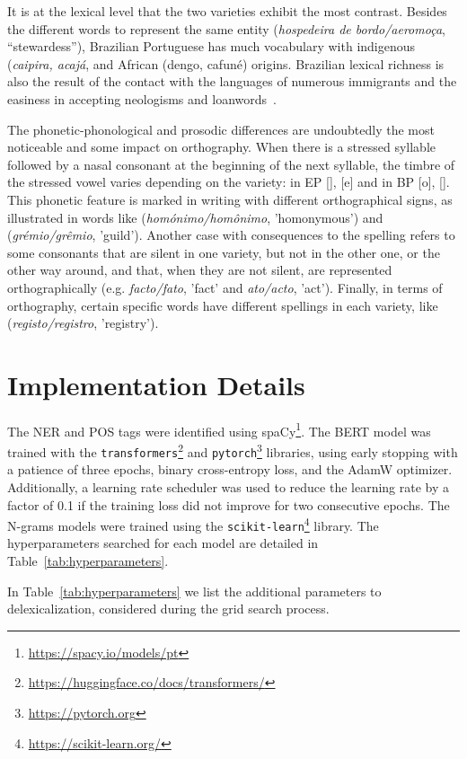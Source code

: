 It is at the lexical level that the two varieties exhibit the most contrast. Besides the different words to represent the same entity (\textit{hospedeira de bordo/aeromoça}, ``stewardess''), Brazilian Portuguese has much vocabulary with indigenous (\textit{caipira, acajá}, and African (dengo, cafuné) origins. Brazilian lexical richness is also the result of the contact with the languages of numerous immigrants and the easiness in accepting neologisms and loanwords~\cite{silva2013portugues}.

The phonetic-phonological and prosodic differences are undoubtedly the most noticeable and some impact on orthography. When there is a stressed syllable followed by a nasal consonant at the beginning of the next syllable, the timbre of the stressed vowel varies depending on the variety: in EP  [\textopeno], [e] and in BP [o], [\textepsilon]. This phonetic feature is marked in writing with different orthographical signs, as illustrated in words like (\textit{homónimo/homônimo}, 'homonymous') and (\textit{grémio/grêmio}, 'guild'). Another case with consequences to the spelling refers to some consonants that are silent in one variety, but not in the other one, or the other way around, and that, when they are not silent, are represented orthographically (e.g. \textit{facto/fato}, 'fact' and \textit{ato/acto}, 'act'). Finally, in terms of orthography, certain specific words have different spellings in each variety, like (\textit{registo/registro}, 'registry').

\section{Implementation Details}
\label{app:hyper}

The NER and POS tags were identified using spaCy\footnote{\url{https://spacy.io/models/pt}}. The BERT model was trained with the \texttt{transformers}\footnote{\url{https://huggingface.co/docs/transformers/}} and \texttt{pytorch}\footnote{\url{https://pytorch.org}} libraries, using early stopping with a patience of three epochs, binary cross-entropy loss, and the AdamW optimizer. Additionally, a learning rate scheduler was used to reduce the learning rate by a factor of 0.1 if the training loss did not improve for two consecutive epochs. The N-grams models were trained using the \texttt{scikit-learn}\footnote{\url{https://scikit-learn.org/}} library. The hyperparameters searched for each model are detailed in Table~\ref{tab:hyperparameters}.

In Table~\ref{tab:hyperparameters} we list the additional parameters to delexicalization, considered during the grid search process.

